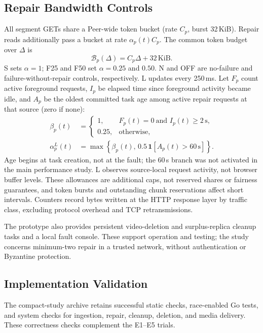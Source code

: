 \subsection{Repair Bandwidth Controls}
All segment GETs share a Peer-wide token bucket (rate $C_p$, burst
32\,KiB). Repair reads additionally pass a bucket at rate
$\alpha_p(t)C_p$. The common token budget over $\Delta$ is
\begin{equation}
 \mathcal{B}_p(\Delta)=C_p\Delta+32\,\mathrm{KiB}.
 \label{eq:shared-budget}
\end{equation}
S sets $\alpha=1$;
F25 and F50 set $\alpha=0.25$ and $0.50$.
N and OFF are no-failure and failure-without-repair controls, respectively.
L updates every 250\,ms. Let $F_p$ count active foreground requests, $I_p$
be elapsed time since foreground activity became idle, and $A_p$ be the
oldest committed task age among active repair requests at that source
(zero if none):
\begin{equation}
 \begin{aligned}
 \beta_p(t)&=\begin{cases}
 1,&F_p(t)=0\ \text{and }I_p(t)\geq2\,\mathrm{s},\\
 0.25,&\text{otherwise},
 \end{cases}\\
 \alpha_p^{L}(t)&=\max\!\left\{\beta_p(t),\,
          0.5\,\mathbf{1}[A_p(t)>60\,\mathrm{s}]\right\}.
 \end{aligned}
 \label{eq:load-aware}
\end{equation}
Age begins at task creation, not at the fault; the 60\,s branch was not
activated in the main performance study. L observes source-local request
activity, not browser buffer levels. These allowances are additional caps,
not reserved shares or fairness guarantees, and token bursts and outstanding
chunk reservations affect short intervals. Counters record bytes written
at the HTTP response layer by traffic class, excluding protocol overhead
and TCP retransmissions.

The prototype also provides persistent video-deletion and surplus-replica
cleanup tasks and a local fault console. These support operation and testing;
the study concerns minimum-two repair in a trusted network, without
authentication or Byzantine protection.

\subsection{Implementation Validation}
The compact-study archive retains successful static checks, race-enabled
Go tests, and system checks for ingestion, repair, cleanup, deletion, and
media delivery. These correctness checks complement the E1--E5 trials.


